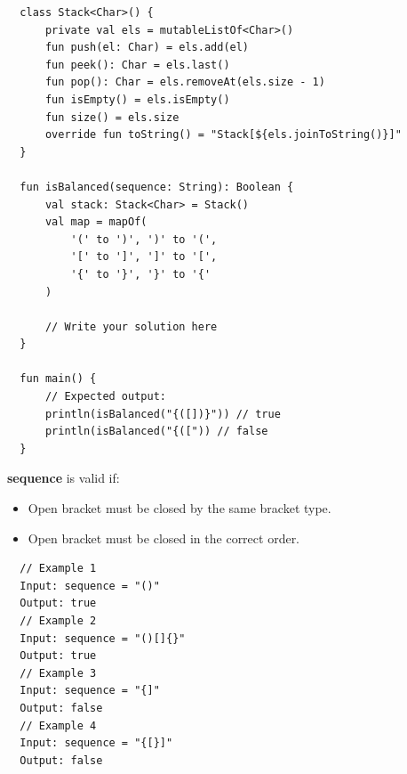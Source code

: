 \documentclass{article}
\begin{document}
\begin{verbatim}
  class Stack<Char>() {
      private val els = mutableListOf<Char>()
      fun push(el: Char) = els.add(el)
      fun peek(): Char = els.last()
      fun pop(): Char = els.removeAt(els.size - 1)
      fun isEmpty() = els.isEmpty()
      fun size() = els.size
      override fun toString() = "Stack[${els.joinToString()}]"
  }

  fun isBalanced(sequence: String): Boolean {
      val stack: Stack<Char> = Stack()
      val map = mapOf(
          '(' to ')', ')' to '(',
          '[' to ']', ']' to '[',
          '{' to '}', '}' to '{'
      )
      
      // Write your solution here
  }

  fun main() {
      // Expected output:
      println(isBalanced("{([])}")) // true
      println(isBalanced("{([")) // false
  }
\end{verbatim}

\textbf{sequence} is valid if:
\begin{itemize}
  \item Open bracket must be closed by the same bracket type.
  \item Open bracket must be closed in the correct order.
\end{itemize}

\begin{verbatim}
  // Example 1
  Input: sequence = "()"
  Output: true
  // Example 2
  Input: sequence = "()[]{}"
  Output: true
  // Example 3
  Input: sequence = "{]"
  Output: false
  // Example 4
  Input: sequence = "{[}]"
  Output: false
\end{verbatim}
\end{document}
